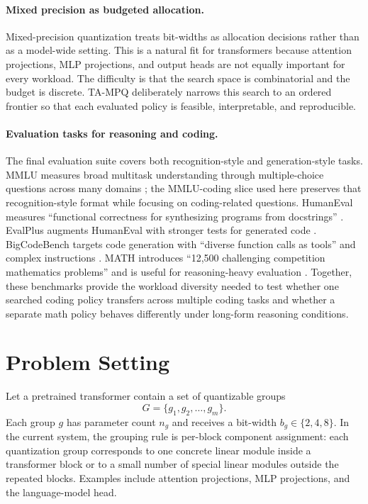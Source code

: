 \documentclass{article}
\newcommand{\method}{TA-MPQ}
\begin{document}
\paragraph{Mixed precision as budgeted allocation.}
Mixed-precision quantization treats bit-widths as allocation decisions rather than as a model-wide setting. This is a natural fit for transformers because attention projections, MLP projections, and output heads are not equally important for every workload. The difficulty is that the search space is combinatorial and the budget is discrete. \method{} deliberately narrows this search to an ordered frontier so that each evaluated policy is feasible, interpretable, and reproducible.

\paragraph{Evaluation tasks for reasoning and coding.}
The final evaluation suite covers both recognition-style and generation-style tasks. MMLU measures broad multitask understanding through multiple-choice questions across many domains \cite{hendrycks2021mmlu}; the MMLU-coding slice used here preserves that recognition-style format while focusing on coding-related questions. HumanEval measures ``functional correctness for synthesizing programs from docstrings'' \cite{chen2021codex}. EvalPlus augments HumanEval with stronger tests for generated code \cite{liu2023evalplus}. BigCodeBench targets code generation with ``diverse function calls as tools'' and complex instructions \cite{zhuo2025bigcodebench}. MATH introduces ``12,500 challenging competition mathematics problems'' and is useful for reasoning-heavy evaluation \cite{hendrycks2021math}. Together, these benchmarks provide the workload diversity needed to test whether one searched coding policy transfers across multiple coding tasks and whether a separate math policy behaves differently under long-form reasoning conditions.

\section{Problem Setting}

Let a pretrained transformer contain a set of quantizable groups
\[
G = \{g_1, g_2, \ldots, g_m\}.
\]
Each group $g$ has parameter count $n_g$ and receives a bit-width $b_g \in \{2,4,8\}$. In the current system, the grouping rule is per-block component assignment: each quantization group corresponds to one concrete linear module inside a transformer block or to a small number of special linear modules outside the repeated blocks. Examples include attention projections, MLP projections, and the language-model head.
\end{document}

